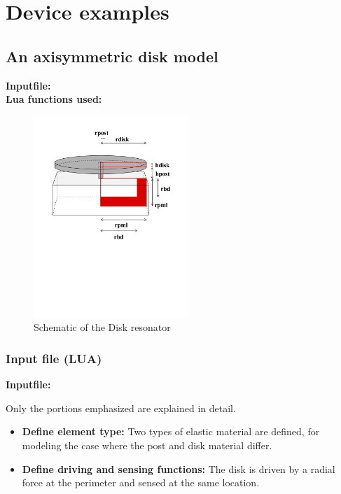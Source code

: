 \clearpage
\section{Device examples}
\subsection{An axisymmetric disk model}
\begin{flushleft}
  \textbf{Inputfile:}
  \\
  \textbf{Lua functions used:}
\end{flushleft}

\begin{figure}[htbp]
\centering
\includegraphics[trim = 0in 4in 0.1in 0in, clip, height = 3in]{fig/disk_resonator.pdf}
\caption{Schematic of the Disk resonator}
\label{fig:DiskResonator}
\end{figure}

\clearpage
\subsubsection*{Input file (LUA)}
\begin{flushleft}
  \textbf{Inputfile:}
  \\
\end{flushleft}
\hspace{1in}
{\footnotesize
{}
}

\clearpage
Only the portions emphasized are explained in detail.

\begin{itemize}

  \item{\textbf{Define element type:}}
  Two types of elastic material are defined, for modeling the 
  case where the post and disk material differ.

  \item{\textbf{Define driving and sensing functions:}}
  The disk is driven by a radial force at the perimeter and 
  sensed at the same location.

\end{itemize}

